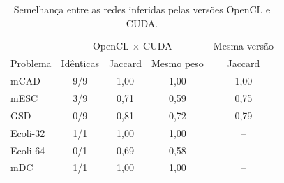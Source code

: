 \begin{table}[htb]
    \centering
    \caption{Semelhança entre as redes inferidas pelas versões OpenCL e CUDA.}
    \label{tab:similaridade}
    \begin{tabular}{l c c c c}
        \hline
        & \multicolumn{3}{c}{OpenCL $\times$ CUDA} & Mesma versão \\
        Problema & Idênticas & Jaccard & Mesmo peso & Jaccard \\
        \hline
        mCAD & 9/9 & 1,00 & 1,00 & 1,00 \\
        mESC & 3/9 & 0,71 & 0,59 & 0,75 \\
        GSD & 0/9 & 0,81 & 0,72 & 0,79 \\
        Ecoli-32 & 1/1 & 1,00 & 1,00 & -- \\
        Ecoli-64 & 0/1 & 0,69 & 0,58 & -- \\
        mDC & 1/1 & 1,00 & 1,00 & -- \\
        \hline
    \end{tabular}
\end{table}
